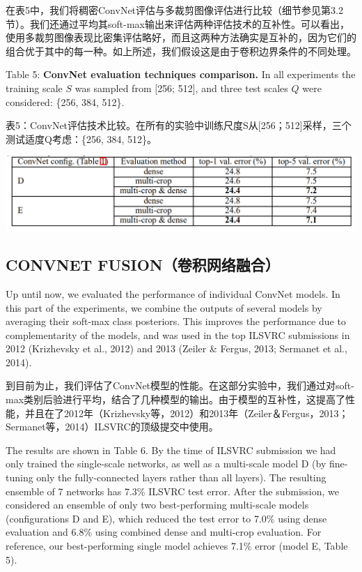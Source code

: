 \documentclass[12pt,a4paper,UTF8,twoside]{book}
\begin{document}
在表5中，我们将稠密ConvNet评估与多裁剪图像评估进行比较（细节参见第3.2节）。我们还通过平均其soft-max输出来评估两种评估技术的互补性。可以看出，使用多裁剪图像表现比密集评估略好，而且这两种方法确实是互补的，因为它们的组合优于其中的每一种。如上所述，我们假设这是由于卷积边界条件的不同处理。

Table 5: \textbf{ConvNet evaluation techniques comparison.} In all experiments the training scale \(S\) was sampled from {[}256; 512{]}, and three test scales \(Q\) were considered: \{256, 384, 512\}.

表5：ConvNet评估技术比较。在所有的实验中训练尺度S从{[}256；512{]}采样，三个测试适度Q考虑：\{256, 384, 512\}。

\begin{center}\includegraphics[width=0.7\linewidth]{img/03-05} \end{center}

\hypertarget{convnet-fusionux5377ux79efux7f51ux7edcux878dux5408}{%
\subsection{CONVNET FUSION（卷积网络融合）}\label{convnet-fusionux5377ux79efux7f51ux7edcux878dux5408}}

Up until now, we evaluated the performance of individual ConvNet models. In this part of the experiments, we combine the outputs of several models by averaging their soft-max class posteriors. This improves the performance due to complementarity of the models, and was used in the top ILSVRC submissions in 2012 (Krizhevsky et al., 2012) and 2013 (Zeiler \& Fergus, 2013; Sermanet et al., 2014).

到目前为止，我们评估了ConvNet模型的性能。在这部分实验中，我们通过对soft-max类别后验进行平均，结合了几种模型的输出。由于模型的互补性，这提高了性能，并且在了2012年（Krizhevsky等，2012）和2013年（Zeiler＆Fergus，2013；Sermanet等，2014）ILSVRC的顶级提交中使用。

The results are shown in Table 6. By the time of ILSVRC submission we had only trained the single-scale networks, as well as a multi-scale model D (by fine-tuning only the fully-connected layers rather than all layers). The resulting ensemble of 7 networks has 7.3\% ILSVRC test error. After the submission, we considered an ensemble of only two best-performing multi-scale models (configurations D and E), which reduced the test error to 7.0\% using dense evaluation and 6.8\% using combined dense and multi-crop evaluation. For reference, our best-performing single model achieves 7.1\% error (model E, Table 5).
\end{document}
